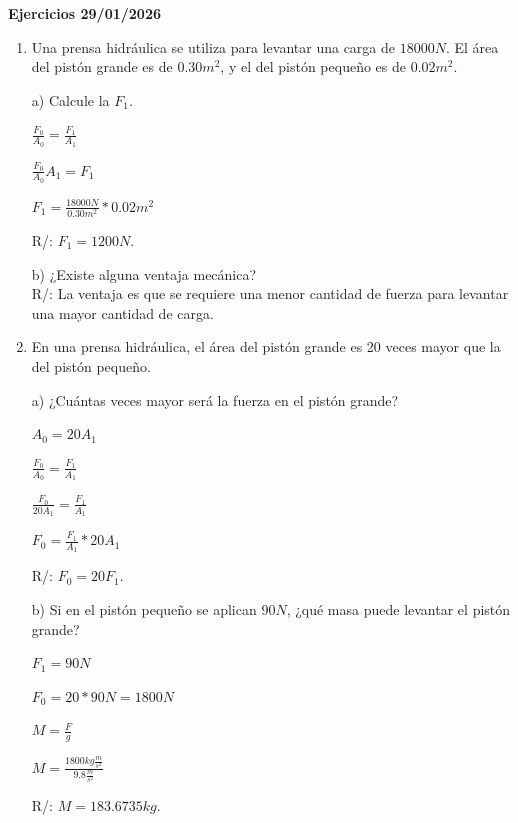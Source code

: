 \documentclass[a4paper, 11pt]{article}
\newcommand{\Pspace}{0.5cm}
\newcommand{\Aspace}{0.2cm}
\begin{document}
    \newpage
    {\Large \textbf{Ejercicios 29/01/2026}}
    \begin{enumerate}
        \vspace{\Pspace}
    \item Una prensa hidráulica se utiliza para levantar una carga de $18000N$. El área del pistón grande es de $0.30m^{2}$, y el del pistón pequeño es de $0.02m^{2}$. \par
            \vspace{\Aspace} \par
            a) Calcule la $F_{1}$.
            \\ { \color{azul} 
                $\frac{F_0}{A_0} = \frac{F_1}{A_1}$
                \par $\frac{F_0}{A_0} A_1 = F_1$
                \par $F_1 = \frac{18000N}{0.30m^{2}} * 0.02m^{2}$
                \par R/: $F_1 = 1200N$.
            }

            \vspace{\Aspace} \par
            b) ¿Existe alguna ventaja mecánica?
            \\ { \color{azul} R/: La ventaja es que se requiere una menor cantidad de fuerza para levantar una mayor cantidad de carga. }



        \vspace{\Pspace}
        \item En una prensa hidráulica, el área del pistón grande es 20 veces mayor que la del pistón pequeño. \par
            \vspace{\Aspace} \par
            a) ¿Cuántas veces mayor será la fuerza en el pistón grande?
            \\ { \color{azul} 
                $A_0 = 20A_1$
                \par $\frac{F_0}{A_0} = \frac{F_1}{A_1}$
                \par $\frac{F_0}{20A_1} = \frac{F_1}{A_1}$
                \par $F_0 = \frac{F_1}{A_1} * 20A_1$
                \par R/: $F_0 = 20F_1$.
            }

            \vspace{\Aspace} \par
            b) Si en el pistón pequeño se aplican $90N$, ¿qué masa puede levantar el pistón grande?
            \\ { \color{azul}
                $F_1 = 90N$
                \par $F_0 = 20 * 90N = 1800N$
                \par $M = \frac{F}{g}$
                \par $M = \frac{1800kg\frac{m}{s^2}}{9.8\frac{m}{s^2}}$
                \par R/: $M = 183.6735 kg$.
            }




\end{enumerate}
\end{document}
